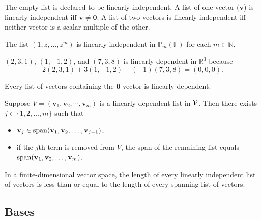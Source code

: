 \begin{exm}
  The empty list is declared to be linearly independent.
  A list of one vector ($\mathbf{v}$) is linearly independent
  iff $\mathbf{v}\ne \mathbf{0}$.
  A list of two vectors is linearly independent iff neither vector
  is a scalar multiple of the other.
\end{exm}

\begin{exm}
  The list $(1,z,\ldots,z^m)$ is linearly independent in 
  $\mathbb{P}_{m}(\mathbb{F})$ for each $m\in \mathbb{N}$.
\end{exm}

\begin{exm}
  $(2,3,1)$, $(1,-1,2)$, and $(7,3,8)$ is linearly dependent in
  $\mathbb{R}^3$
  because
  \begin{equation*}
    2(2,3,1)+3(1,-1,2)+(-1)(7,3,8)=(0,0,0).
  \end{equation*}
\end{exm}

\begin{exm}
  Every list of vectors containing the $\mathbf{0}$ vector
  is linearly dependent.
\end{exm}

\begin{lem}
  Suppose \mbox{$V=(\mathbf{v}_1,\mathbf{v}_2,\cdots,\mathbf{v}_m)$}
  is a linearly dependent list in ${\cal V}$.
  Then there exists $j\in \{1,2,\ldots,m\}$ such that
  \begin{itemize}\itemsep0em
  \item $\mathbf{v}_j\in \mathrm{span}(\mathbf{v}_1,\mathbf{v}_2,\ldots,\mathbf{v}_{j-1})$;
  \item if the $j$th term is removed from $V$,
    the span of the remaining list equals $\mathrm{span}(\mathbf{v}_1,\mathbf{v}_2,\ldots,\mathbf{v}_{m})$.
  \end{itemize}
\end{lem}

\begin{lem}
  \label{lem:lengthOfIndependentAndSpanningLists}
  In a finite-dimensional vector space, the length
  of every linearly independent list of vectors
  is less than or equal to the length of every
  spanning list of vectors.
\end{lem}


\subsection{Bases}
\label{sec:bases}

